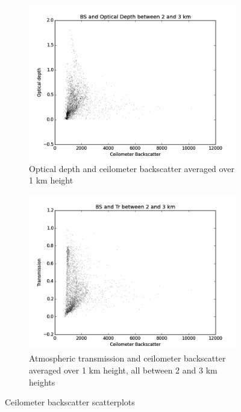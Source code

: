 \documentclass[a4paper,titlepage, twoside]{report}
\begin{document}
\begin{figure}
\begin{subfigure}{0.48\textwidth}
\includegraphics[width=\textwidth]{BS2_tau.png}
\caption{Optical depth and ceilometer backscatter averaged over 1 km height}
\end{subfigure}
\hfill
\begin{subfigure}{0.48\textwidth}
\includegraphics[width=\textwidth]{BS2_Tr.png}
\caption{Atmospheric transmission and ceilometer backscatter averaged over 1 km height, all  between 2 and 3 km heights}
\end{subfigure}
\caption{Ceilometer backscatter scatterplots}
\label{fig:data-10}
\end{figure}
\end{document}
